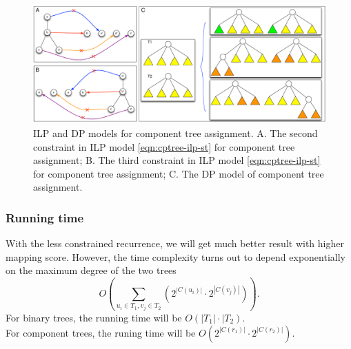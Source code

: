 \begin{figure}[htbp]
\centering
\includegraphics[width=1.0\textwidth]{images/treeassign_cptree}
\caption[ILP and DP models for component tree assignment]{ILP and DP models for component tree assignment. A. The second constraint in ILP model \ref{eqn:cptree-ilp-st} for component tree assignment; B. The third constraint in ILP model \ref{eqn:cptree-ilp-st} for component tree assignment; C. The DP model of component tree assignment.}
\label{fig:treeassign-cptree}
\end{figure}

\subsubsection{Running time}
With the less constrained recurrence, we will get much better result with higher mapping score. However, the time complexity turns out to depend exponentially on the maximum degree of the two trees
\begin{equation} \label{eqn:lcdp-time}
O\left(\sum_{u_i \in T_1, v_j \in T_2}(2^{|C(u_i)|}\cdot 2^{|C(v_j)|})\right).
\end{equation}
For binary trees, the running time will be
$O(|T_1|\cdot|T_2)$. \\
For component trees, the runing time will be 
$O\left(2^{|C(r_1)|}\cdot2^{|C(r_2)|}\right)$. \\
